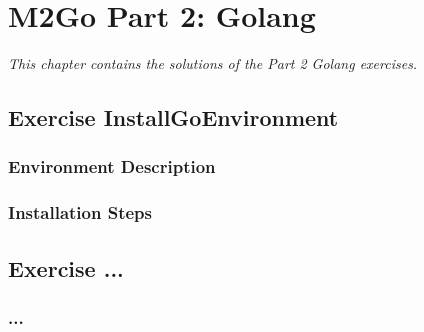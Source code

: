 \chapter{M2Go Part 2: Golang}
\label{cha:golang}
\textit{This chapter contains the solutions of the Part 2 Golang exercises.}

\section{Exercise InstallGoEnvironment}

\subsection{Environment Description}

\subsection{Installation Steps}

\section{Exercise ...}

\subsection{...}

